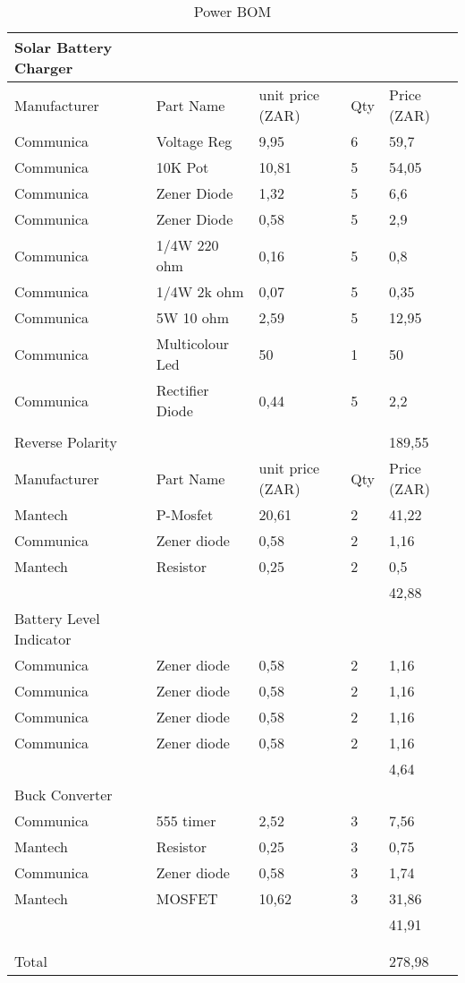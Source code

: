 \documentclass[class=report,11pt,crop=false]{standalone}
\begin{document}
\begin{table}
\centering

\begin{tabular}{|l |l |l |l |l|} \hline 
Solar Battery Charger &  &  &  &  \\ \hline 
Manufacturer & Part Name & unit price (ZAR) & Qty & Price (ZAR) \\ \hline 
Communica & Voltage Reg & 9,95 & 6 & 59,7 \\ \hline 
Communica & 10K Pot & 10,81 & 5 & 54,05 \\ \hline 
Communica & Zener Diode & 1,32 & 5 & 6,6 \\ \hline 
Communica & Zener Diode & 0,58 & 5 & 2,9 \\ \hline 
Communica & 1/4W 220 ohm & 0,16 & 5 & 0,8 \\ \hline 
Communica & 1/4W 2k ohm & 0,07 & 5 & 0,35 \\ \hline 
Communica & 5W 10 ohm & 2,59 & 5 & 12,95 \\ \hline 
Communica & Multicolour Led & 50 & 1 & 50 \\ \hline 
Communica & Rectifier Diode & 0,44 & 5 & 2,2 \\ \hline 
 &  &  &  &  \\ \hline 
Reverse Polarity &  &  &  & 189,55 \\ \hline 
Manufacturer & Part Name & unit price (ZAR) & Qty & Price (ZAR) \\ \hline 
Mantech & P-Mosfet & 20,61 & 2 & 41,22 \\ \hline 
Communica & Zener diode & 0,58 & 2 & 1,16 \\ \hline 
Mantech & Resistor & 0,25 & 2 & 0,5 \\ \hline 
 &  &  &  & 42,88 \\ \hline 
Battery Level Indicator &  &  &  &  \\ \hline 
Communica & Zener diode & 0,58 & 2 & 1,16 \\ \hline 
Communica & Zener diode & 0,58 & 2 & 1,16 \\ \hline 
Communica & Zener diode & 0,58 & 2 & 1,16 \\ \hline 
Communica & Zener diode & 0,58 & 2 & 1,16 \\ \hline 
 &  &  &  & 4,64 \\ \hline 
Buck Converter &  &  &  &  \\ \hline 
Communica & 555 timer & 2,52 & 3 & 7,56 \\ \hline 
Mantech & Resistor & 0,25 & 3 & 0,75 \\ \hline 
Communica & Zener diode & 0,58 & 3 & 1,74 \\ \hline 
Mantech & MOSFET & 10,62 & 3 & 31,86 \\ \hline 
 &  &  &  & 41,91 \\ \hline 
 &  &  &  &  \\ \hline 
 &  &  &  &  \\ \hline 
Total &  &  &  & 278,98 \\ \hline

\end{tabular}
\caption{Power BOM}
\label{tab:my_table}
\end{table}

\ifstandalone

\printnoidxglossary[type=\acronymtype,nonumberlist]
\fi
\end{document}
